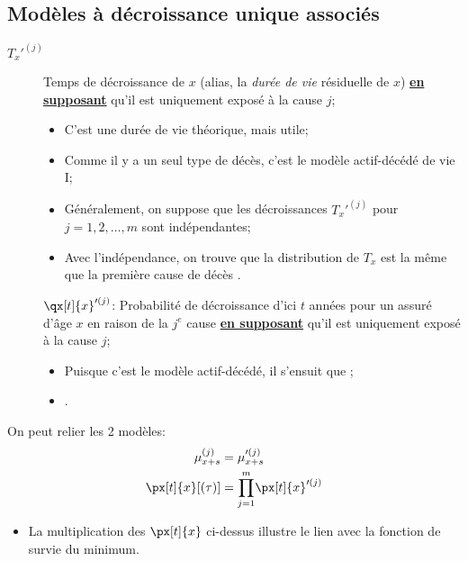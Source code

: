 \documentclass[10pt, french]{article}
\begin{document}
\begin{multicols*}{2}
\subsection*{Modèles à décroissance unique associés}
\begin{description}
	\item[$T_{x}'^{(j)}$]	Temps de décroissance de $x$ (alias, la \textit{durée de vie} résiduelle de $x$) \underline{\textbf{en supposant}} qu'il est uniquement exposé à la cause $j$;
		\begin{itemize}[leftmargin = *]
		\item	C'est une durée de vie théorique, mais utile;
		\item	Comme il y a un seul type de décès, c'est le modèle actif-décédé de vie I;
		\item	Généralement, on suppose que les décroissances $T_{x}'^{(j)}$ pour $j = 1, 2, \dots, m$ sont indépendantes;
		\item	Avec l'indépendance, on trouve que la distribution de $T_{x}$ est la même que la première cause de décès .
		\end{itemize}
	\item[]	$\qx[t]{x}'^{(j)}$:	Probabilité de décroissance d'ici $t$ années pour un assuré d'âge $x$ en raison de la $j^{e}$ cause \underline{\textbf{en supposant}} qu'il est uniquement exposé à la cause $j$;
		\begin{itemize}[leftmargin = *]
		\item	Puisque c'est le modèle actif-décédé, il s'ensuit que ;
		\item	{}.
		\end{itemize}
\end{description}

On peut relier les 2 modèles:
\begin{align*}
	\mu_{x + s}^{(j)}
	&=	\mu_{x + s}'^{(j)}	\\
	\px[t]{x}[(\tau)]
	&=	\underset{j = 1}{\overset{m}{\prod}} \px[t]{x}'^{(j)}
\end{align*}
\begin{itemize}[leftmargin = *]
	\item	 La multiplication des $\px[t]{x}$ ci-dessus illustre le lien avec la fonction de survie du minimum.
\end{itemize}


\end{multicols*}
\end{document}
